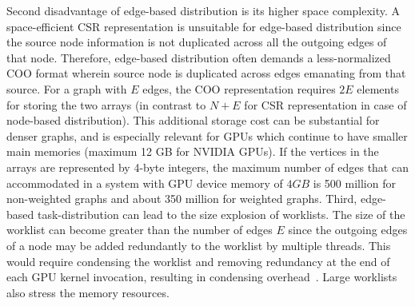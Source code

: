 Second disadvantage of edge-based distribution is its higher space complexity. 
A space-efficient CSR representation is unsuitable for edge-based distribution since the source node information is not duplicated across all the outgoing edges of that node.
Therefore, edge-based distribution often demands a less-normalized COO format wherein source node is duplicated across edges emanating from that source.
For a graph with $E$ edges, the COO representation requires $2E$ elements for storing the two arrays (in contrast to $N + E$ for CSR representation in case of node-based distribution).
This additional storage cost can be substantial for denser graphs, and is especially relevant for GPUs which continue to have smaller main memories (maximum 12 GB for NVIDIA GPUs).
If the vertices in the arrays are represented by 4-byte integers, the maximum number of edges that can accommodated in a system with GPU device memory of $4GB$ is 500 million for non-weighted graphs and about 350 million for weighted graphs. 
Third, edge-based task-distribution can lead to the size explosion of worklists. 
The size of the worklist can become greater than the number of edges $E$ since the outgoing edges of a node may be added redundantly to the worklist by multiple threads. 
This would require condensing the worklist and removing redundancy at the end of each GPU kernel invocation, resulting in condensing overhead~\cite{merrill-scalablegputraversal-ppopp2012}.
Large worklists also stress the memory resources.
